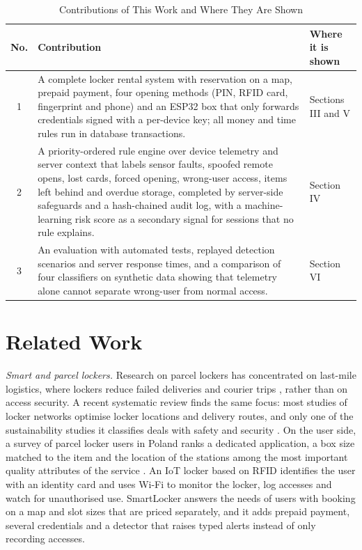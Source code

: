 \begin{table}[!htbp]\renewcommand{\arraystretch}{0.88}
\renewcommand{\arraystretch}{1.0}
\centering
\small
\caption{Contributions of This Work and Where They Are Shown}
\label{tab:contrib}
\footnotesize
\begin{tabular}{c p{11.6cm} p{3.0cm}}
\hline
No. & Contribution & Where it is shown \\
\hline
1 & A complete locker rental system with reservation on a map, prepaid payment, four opening methods (PIN, RFID card,
    fingerprint and phone) and an ESP32 box that only forwards credentials signed with a per-device key; all money and
    time rules run in database transactions. & Sections III and V \\
2 & A priority-ordered rule engine over device telemetry and server context that labels sensor faults, spoofed remote
    opens, lost cards, forced opening, wrong-user access, items left behind and overdue storage, completed by
    server-side safeguards and a hash-chained audit log, with a machine-learning risk score as a secondary signal for
    sessions that no rule explains. & Section IV \\
3 & An evaluation with automated tests, replayed detection scenarios and server response times, and a comparison of
    four classifiers on synthetic data showing that telemetry alone cannot separate wrong-user from normal access. &
    Section VI \\
\hline
\end{tabular}
\end{table}

\section{Related Work}

\textit{Smart and parcel lockers.} Research on parcel lockers has concentrated on last-mile logistics, where lockers
reduce failed deliveries and courier trips \cite{iwan2016parcel}, rather than on access security. A recent systematic
review finds the same focus: most studies of locker networks optimise locker locations and delivery routes, and only
one of the sustainability studies it classifies deals with safety and security \cite{zhang2025parcel}. On the user
side, a survey of parcel locker users in Poland ranks a dedicated application, a box size matched to the item and the
location of the stations among the most important quality attributes of the service \cite{ciesla2023parcel}. An IoT
locker based on RFID \cite{rfidiot2023locker} identifies the user with an identity card and uses Wi-Fi to monitor the
locker, log accesses and watch for unauthorised use. SmartLocker answers the needs of users with booking on a map and
slot sizes that are priced separately, and it adds prepaid payment, several credentials and a detector that raises
typed alerts instead of only recording accesses.

